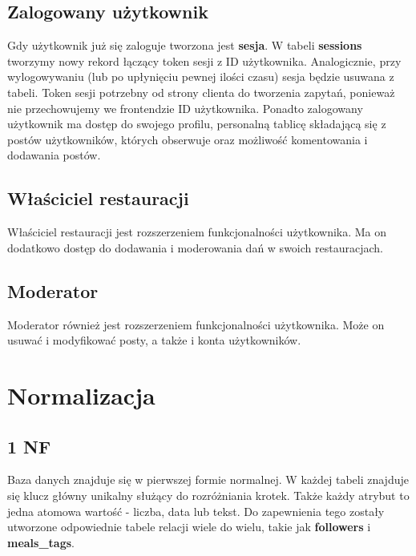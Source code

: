 \documentclass{report}
\begin{document}
\subsection*{Zalogowany użytkownik}
Gdy użytkownik już się zaloguje tworzona jest \textbf{sesja}. W tabeli
\textbf{sessions} tworzymy nowy rekord łączący token sesji z ID użytkownika.
Analogicznie, przy wylogowywaniu (lub po upłynięciu pewnej ilości czasu)
sesja będzie usuwana z tabeli. Token sesji potrzebny od strony clienta do
tworzenia zapytań, ponieważ nie przechowujemy we frontendzie ID użytkownika.
Ponadto zalogowany użytkownik ma dostęp do swojego profilu, personalną tablicę
składającą się z postów użytkowników, których obserwuje oraz możliwość komentowania
i dodawania postów.
\subsection*{Właściciel restauracji}
Właściciel restauracji jest rozszerzeniem funkcjonalności użytkownika. Ma on
dodatkowo dostęp do dodawania i moderowania dań w swoich restauracjach.
\subsection*{Moderator}
Moderator również jest rozszerzeniem funkcjonalności użytkownika. Może on
usuwać i modyfikować posty, a także i konta użytkowników.

\section*{Normalizacja}

\subsection*{1 NF}
Baza danych znajduje się w pierwszej formie normalnej. 
W każdej tabeli znajduje się klucz główny unikalny służący do rozróżniania krotek.
Także każdy atrybut to jedna atomowa wartość - liczba, data lub tekst.
Do zapewnienia tego zostały utworzone odpowiednie tabele relacji wiele do wielu, takie jak 
\textbf{followers} i \textbf{meals\_tags}.
\end{document}
